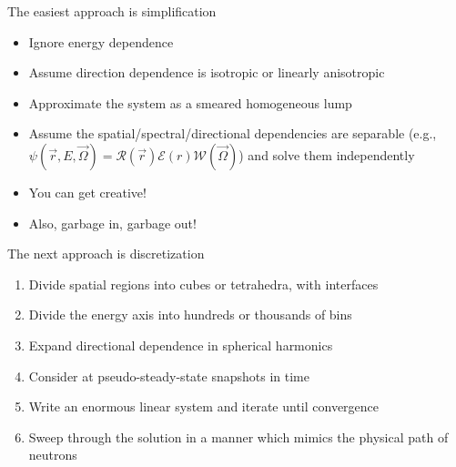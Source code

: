 \documentclass{beamer}
\begin{document}
        \begin{frame}{The easiest approach is simplification}
            \begin{itemize}
                \item Ignore energy dependence
                \pause
                \item Assume direction dependence is isotropic or linearly anisotropic
                \pause
                \item Approximate the system as a smeared homogeneous lump
                \pause
                \item Assume the spatial/spectral/directional dependencies are separable
                      (e.g., $\psi(\vec r, E, \vec\Omega) = \mathcal{R}(\vec r)\mathcal{E}(r)\mathcal{W}(\vec\Omega)$)
                      and solve them independently
                \pause

                \vspace{2em}

                \item You can get creative!
                \pause
                \item Also, garbage in, garbage out!
            \end{itemize}
        \end{frame}

        \begin{frame}{The next approach is discretization}
            \begin{enumerate}
                \item Divide spatial regions into cubes or tetrahedra, with interfaces
                \pause
                \item Divide the energy axis into hundreds or thousands of bins
                \pause
                \item Expand directional dependence in spherical harmonics
                \pause
                \item Consider at pseudo-steady-state snapshots in time
                \pause
                \item Write an enormous linear system and iterate until convergence
                \pause
                \item Sweep through the solution in a manner which mimics the physical path of neutrons
            \end{enumerate}
        \end{frame}
\end{document}
